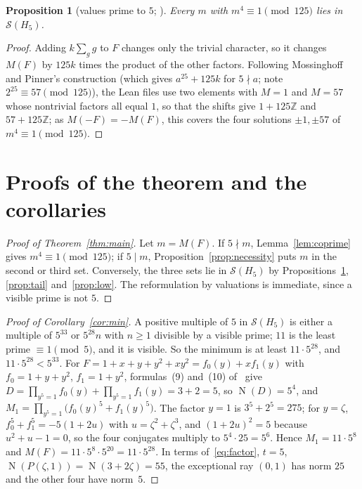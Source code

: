 \documentclass[11pt]{article}
\newtheorem{proposition}{Proposition}
\theoremstyle{definition}
\theoremstyle{remark}
\newcommand{\Z}{\mathbb Z}
\newcommand{\N}{\operatorname{N}}
\newcommand{\cS}{\mathcal S}
\begin{document}
\begin{proposition}[{values prime to $5$; \cite[Theorem~3.3]{mp}}]\label{prop:coprime}
Every $m$ with $m^4\equiv1\pmod{125}$ lies in $\cS(H_5)$.
\end{proposition}

\begin{proof}
Adding $k\sum_gg$ to $F$ changes only the trivial character, so it changes
$M(F)$ by $125k$ times the product of the other factors. Following
Mossinghoff and Pinner's construction (which gives $a^{25}+125k$ for
$5\nmid a$; note $2^{25}\equiv57\pmod{125}$), the Lean files use two elements
with $M=1$ and $M=57$ whose nontrivial factors all equal $1$, so that the
shifts give $1+125\Z$ and $57+125\Z$; as $M(-F)=-M(F)$, this covers the four
solutions $\pm1,\pm57$ of $m^4\equiv1\pmod{125}$.
\end{proof}

\section{Proofs of the theorem and the corollaries}\label{sec:proofs}

\begin{proof}[Proof of Theorem~\ref{thm:main}]
Let $m=M(F)$. If $5\nmid m$, Lemma~\ref{lem:coprime} gives
$m^4\equiv1\pmod{125}$; if $5\mid m$, Proposition~\ref{prop:necessity} puts
$m$ in the second or third set. Conversely, the three sets lie in
$\cS(H_5)$ by Propositions~\ref{prop:coprime}, \ref{prop:tail}
and~\ref{prop:low}. The reformulation by valuations is immediate, since a
visible prime is not $5$.
\end{proof}

\begin{proof}[Proof of Corollary~\ref{cor:min}]
A positive multiple of $5$ in $\cS(H_5)$ is either a multiple of $5^{33}$ or
$5^{28}n$ with $n\ge1$ divisible by a visible prime; $11$ is the least prime
$\equiv1\pmod5$, and it is visible. So the minimum is
at least $11\cdot5^{28}$, and $11\cdot5^{28}<5^{33}$. For
$F=1+x+y+y^2+xy^2=f_0(y)+xf_1(y)$ with $f_0=1+y+y^2$, $f_1=1+y^2$,
formulas~(9) and~(10) of~\cite{mp} give
$D=\prod_{y^5=1}f_0(y)+\prod_{y^5=1}f_1(y)=3+2=5$, so $\N(D)=5^4$, and
$M_1=\prod_{y^5=1}\bigl(f_0(y)^5+f_1(y)^5\bigr)$. The factor $y=1$ is
$3^5+2^5=275$; for $y=\zeta$, $f_0^5+f_1^5=-5(1+2u)$ with
$u=\zeta^2+\zeta^3$, and $(1+2u)^2=5$ because $u^2+u-1=0$, so the four
conjugates multiply to $5^4\cdot25=5^6$. Hence $M_1=11\cdot5^8$ and
$M(F)=11\cdot5^8\cdot5^{20}=11\cdot5^{28}$. In terms of~\eqref{eq:factor},
$t=5$, $\N(P(\zeta,1))=\N(3+2\zeta)=55$, the exceptional ray $(0,1)$ has norm
$25$ and the other four have norm~$5$.
\end{proof}
\end{document}
